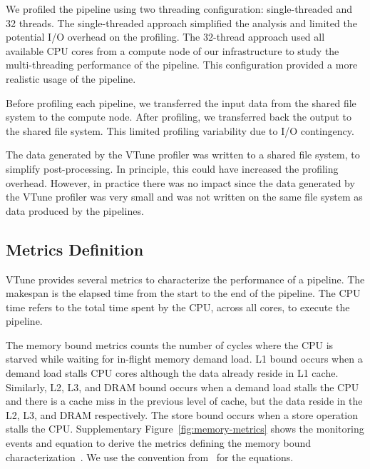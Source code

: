 \documentclass[conference]{IEEEtran}
\begin{document}
\begin{minipage}{0.9\linewidth}
	
\end{minipage}
			
We profiled the pipeline using two threading configuration: single-threaded and 32 threads. The single-threaded approach simplified the analysis and limited the potential I/O overhead on the profiling. 
The 32-thread approach used all available CPU cores from a compute node of our infrastructure to study the multi-threading performance of the pipeline. This configuration provided a more realistic usage of the pipeline.
			
Before profiling each pipeline, we transferred the input data from the shared file system to the compute node. After profiling, we transferred back the output to the shared file system. This limited profiling variability due to I/O contingency.
			
The data generated by the VTune profiler was written to a shared file system, to simplify post-processing. In principle, this could have increased the profiling overhead. However, in practice there was no impact since the data generated by the VTune profiler was very small and was not written on the same file system as data produced by the pipelines.
			 
\subsection{Metrics Definition}
VTune provides several metrics to characterize the performance of a pipeline.  The makespan is the elapsed time from the start to the end of the pipeline. The CPU time refers to the total time spent by the CPU, across all cores, to execute the pipeline. 

The memory bound metrics counts the number of cycles where the CPU is starved while waiting for in-flight memory demand load. L1 bound occurs when a demand load stalls CPU cores although the data already reside in L1 cache. Similarly, L2, L3, and DRAM bound occurs when a demand load stalls the CPU and there is a cache miss in the previous level of cache, but the data reside in the L2, L3, and DRAM respectively. The store bound occurs when a store operation stalls the CPU. Supplementary Figure~\ref{fig:memory-metrics} shows the monitoring events and equation to derive the metrics defining the memory bound characterization~\cite{Intel2006-lc}. We use the convention from~\cite{Kukunas2015-jd} for the equations.
			
\end{document}
